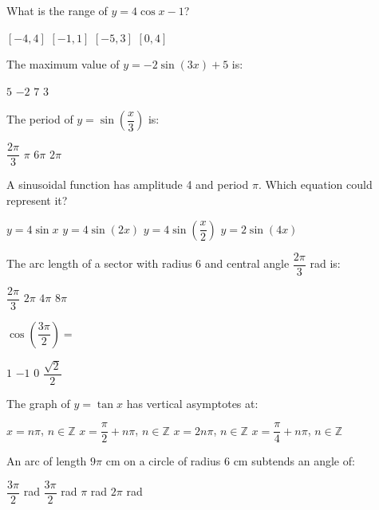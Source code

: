 \documentclass[addpoints]{exam}
\begin{document}
\begin{questions}
\question[1] What is the range of $y = 4\cos x - 1$?
\begin{choices}
    \choice $[-4, 4]$
    \choice $[-1, 1]$
    \correctchoice $[-5, 3]$
    \choice $[0, 4]$
\end{choices}

\question[1] The maximum value of $y = -2\sin(3x) + 5$ is:
\begin{choices}
    \choice $5$
    \choice $-2$
    \correctchoice $7$
    \choice $3$
\end{choices}

\question[1] The period of $y = \sin\!\left(\dfrac{x}{3}\right)$ is:
\begin{choices}
    \choice $\dfrac{2\pi}{3}$
    \choice $\pi$
    \correctchoice $6\pi$
    \choice $2\pi$
\end{choices}

\question[1] A sinusoidal function has amplitude 4 and period $\pi$. Which equation
could represent it?
\begin{choices}
    \choice $y = 4\sin x$
    \correctchoice $y = 4\sin(2x)$
    \choice $y = 4\sin\!\left(\dfrac{x}{2}\right)$
    \choice $y = 2\sin(4x)$
\end{choices}

\question[1] The arc length of a sector with radius 6 and central angle $\dfrac{2\pi}{3}$
rad is:
\begin{choices}
    \choice $\dfrac{2\pi}{3}$
    \choice $2\pi$
    \correctchoice $4\pi$
    \choice $8\pi$
\end{choices}

\question[1] $\cos\!\left(\dfrac{3\pi}{2}\right) =$
\begin{choices}
    \choice $1$
    \choice $-1$
    \correctchoice $0$
    \choice $\dfrac{\sqrt{2}}{2}$
\end{choices}

\question[1] The graph of $y = \tan x$ has vertical asymptotes at:
\begin{choices}
    \choice $x = n\pi$, $n \in \mathbb{Z}$
    \correctchoice $x = \dfrac{\pi}{2} + n\pi$, $n \in \mathbb{Z}$
    \choice $x = 2n\pi$, $n \in \mathbb{Z}$
    \choice $x = \dfrac{\pi}{4} + n\pi$, $n \in \mathbb{Z}$
\end{choices}

\question[1] An arc of length $9\pi$ cm on a circle of radius 6 cm subtends an angle of:
\begin{choices}
    \choice $\dfrac{3\pi}{2}$ rad
    \correctchoice $\dfrac{3\pi}{2}$ rad
    \choice $\pi$ rad
    \choice $2\pi$ rad
\end{choices}



\end{questions}
\end{document}
